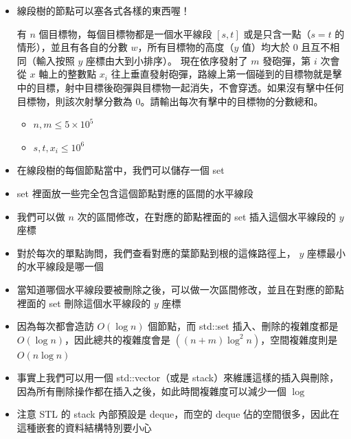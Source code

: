 \documentclass[standalone]{beamer}
\begin{document}
\begin{frame}[fragile]{}
  \begin{itemize}
    \item 線段樹的節點可以塞各式各樣的東西喔！
    \begin{problem}[二維區間求和]
      有 $n$ 個目標物，每個目標物都是一個水平線段 $[s, t]$ 或是只含一點（$s = t$ 的情形），並且有各自的分數 $w$，所有目標物的高度（$y$ 值）均大於 $0$ 且互不相同（輸入按照 $y$ 座標由大到小排序）。
      現在依序發射了 $m$ 發砲彈，第 $i$ 次會從 $x$ 軸上的整數點 $x_i$ 往上垂直發射砲彈，路線上第一個碰到的目標物就是擊中的目標，射中目標後砲彈與目標物一起消失，不會穿透。如果沒有擊中任何目標物，則該次射擊分數為 0。請輸出每次有擊中的目標物的分數總和。
      \begin{itemize}
        \item $n, m \leq 5 \times 10^5$
        \item $s,t,x_i \leq 10^6$
      \end{itemize}
    \end{problem}
  \end{itemize}
\end{frame}

\begin{frame}[fragile]{}
  \begin{itemize}
    \item 在線段樹的每個節點當中，我們可以儲存一個 set
    \item set 裡面放一些完全包含這個節點對應的區間的水平線段
    \item 我們可以做 $n$ 次的區間修改，在對應的節點裡面的 set 插入這個水平線段的 $y$ 座標
    \item 對於每次的單點詢問，我們查看對應的葉節點到根的這條路徑上， $y$ 座標最小的水平線段是哪一個
    \item 當知道哪個水平線段要被刪除之後，可以做一次區間修改，並且在對應的節點裡面的 set 刪除這個水平線段的 $y$ 座標
    \item 因為每次都會造訪 $O(\log n)$ 個節點，而 std::set 插入、刪除的複雜度都是 $O(\log n)$，因此總共的複雜度會是 $((n+m)\log ^2 n)$，空間複雜度則是 $O(n\log n)$
  \end{itemize}
\end{frame}

\begin{frame}[fragile]{}
  \begin{itemize}
    \item 事實上我們可以用一個 std::vector（或是 stack）來維護這樣的插入與刪除，因為所有刪除操作都在插入之後，如此時間複雜度可以減少一個 $\log$
    \item 注意 STL 的 stack 內部預設是 deque，而空的 deque 佔的空間很多，因此在這種嵌套的資料結構特別要小心
  \end{itemize}
\end{frame}
\end{document}
